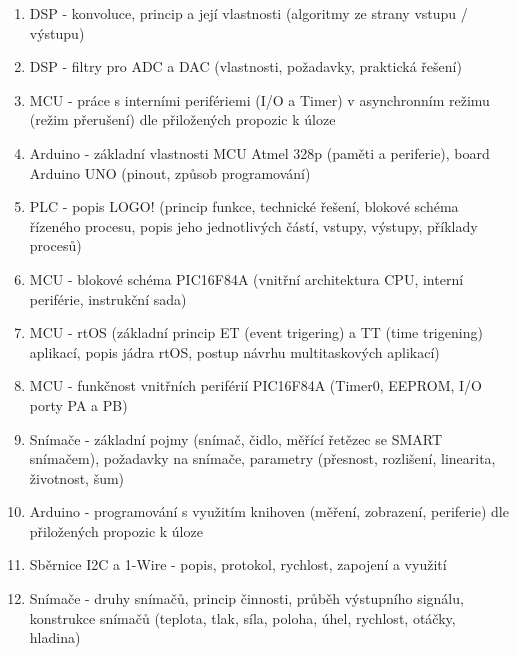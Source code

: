 \documentclass[a4paper,11pt]{article}
\begin{document}
\begin{enumerate}
    \item DSP - konvoluce, princip a její vlastnosti (algoritmy ze strany vstupu / výstupu)
    \item DSP - filtry pro ADC a DAC (vlastnosti, požadavky, praktická řešení)
    \item MCU - práce s interními perifériemi (I/O a Timer) v asynchronním režimu (režim přerušení) dle přiložených propozic k úloze
    \item Arduino - základní vlastnosti MCU Atmel 328p (paměti a periferie), board Arduino UNO (pinout, způsob programování)
    \item PLC - popis LOGO! (princip funkce, technické řešení, blokové schéma řízeného procesu, popis jeho jednotlivých částí, vstupy, výstupy, příklady procesů)
    \item MCU - blokové schéma PIC16F84A (vnitřní architektura CPU, interní periférie, instrukční sada)
    \item MCU - rtOS (základní princip ET (event trigering) a TT (time trigening) aplikací, popis jádra rtOS, postup návrhu multitaskových aplikací)
    \item MCU - funkčnost vnitřních periférií PIC16F84A (Timer0, EEPROM, I/O porty PA a PB)
    \item Snímače - základní pojmy (snímač, čidlo, měřící řetězec se SMART snímačem), požadavky na snímače, parametry (přesnost, rozlišení, linearita, životnost, šum)
    \item Arduino - programování s využitím knihoven (měření, zobrazení, periferie) dle přiložených propozic k úloze
    \item Sběrnice I2C a 1-Wire - popis, protokol, rychlost, zapojení a využití
    \item Snímače - druhy snímačů, princip činnosti, průběh výstupního signálu, konstrukce snímačů (teplota, tlak, síla, poloha, úhel, rychlost, otáčky, hladina)
\end{enumerate}



























\end{document}
